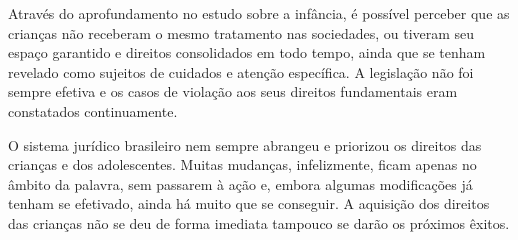 Através do aprofundamento no estudo sobre a infância, é possível perceber que as crianças não receberam o mesmo tratamento nas sociedades, ou tiveram seu espaço garantido e direitos consolidados em todo tempo, ainda que se tenham revelado como sujeitos de cuidados e atenção específica. A legislação não foi sempre efetiva e os casos de violação aos seus direitos fundamentais eram constatados continuamente. 

O sistema jurídico brasileiro nem sempre abrangeu e priorizou os direitos das crianças e dos adolescentes. Muitas mudanças, infelizmente, ficam apenas no âmbito da palavra, sem passarem à ação e, embora algumas modificações já tenham se efetivado, ainda há muito que se conseguir. A aquisição dos direitos das crianças não se deu de forma imediata tampouco se darão os próximos êxitos. 